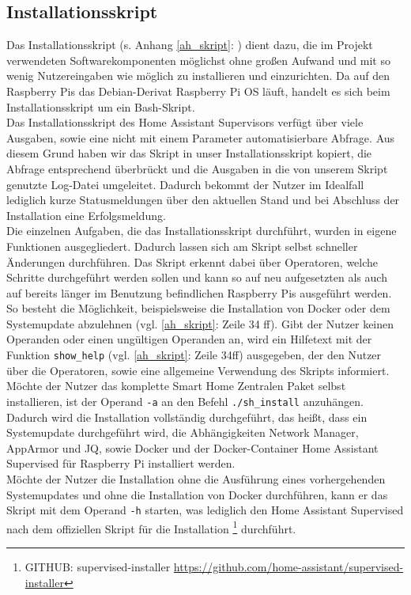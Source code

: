 \subsection{Installationsskript}\label{sw_install}
Das Installationsskript (s. Anhang \ref{ah_skript}: ) dient dazu, die im Projekt verwendeten Softwarekomponenten möglichst ohne großen Aufwand und mit so wenig Nutzereingaben wie möglich zu installieren und einzurichten. 
Da auf den Raspberry Pis das Debian-Derivat Raspberry Pi OS läuft, handelt es sich beim Installationsskript um ein Bash-Skript.\\
\noindent Das Installationsskript des Home Assistant Supervisors verfügt über viele Ausgaben, sowie eine nicht mit einem Parameter automatisierbare Abfrage.
Aus diesem Grund haben wir das Skript in unser Installationsskript kopiert, die Abfrage entsprechend überbrückt und die Ausgaben in die von unserem Skript genutzte Log-Datei umgeleitet.
Dadurch bekommt der Nutzer im Idealfall lediglich kurze Statusmeldungen über den aktuellen Stand und bei Abschluss der Installation eine Erfolgsmeldung.\\
\noindent Die einzelnen Aufgaben, die das Installationsskript durchführt, wurden in eigene Funktionen ausgegliedert. 
Dadurch lassen sich am Skript selbst schneller Änderungen durchführen. 
Das Skript erkennt dabei über Operatoren, welche Schritte durchgeführt werden sollen und kann so auf neu aufgesetzten als auch auf bereits länger im Benutzung befindlichen Raspberry Pis ausgeführt werden.\\
\noindent So besteht die Möglichkeit, beispielsweise die Installation von Docker oder dem Systemupdate abzulehnen (vgl. \ref{ah_skript}:  Zeile 34 ff).
Gibt der Nutzer keinen Operanden oder einen ungültigen Operanden an, wird ein Hilfetext mit der Funktion \texttt{show\_help} (vgl. \ref{ah_skript}:  Zeile 34ff) ausgegeben, der den Nutzer über die Operatoren, sowie eine allgemeine Verwendung des Skripts informiert.\\
\noindent Möchte der Nutzer das komplette Smart Home Zentralen Paket selbst installieren, ist der Operand \texttt{-a} an den Befehl \texttt{./sh\_install} anzuhängen. 
Dadurch wird die Installation vollständig durchgeführt, das heißt, dass ein Systemupdate durchgeführt wird, die Abhängigkeiten Network Manager, AppArmor und JQ, sowie Docker und der Docker-Container Home Assistant Supervised für Raspberry Pi installiert werden.\\
\noindent Möchte der Nutzer die Installation ohne die Ausführung eines vorhergehenden Systemupdates und ohne die Installation von Docker durchführen, kann er das Skript mit dem Operand \texttt{-h} starten, was lediglich den Home Assistant Supervised nach dem offiziellen Skript für die Installation \footnote{GITHUB: supervised-installer \url{https://github.com/home-assistant/supervised-installer}} durchführt.\\ 
